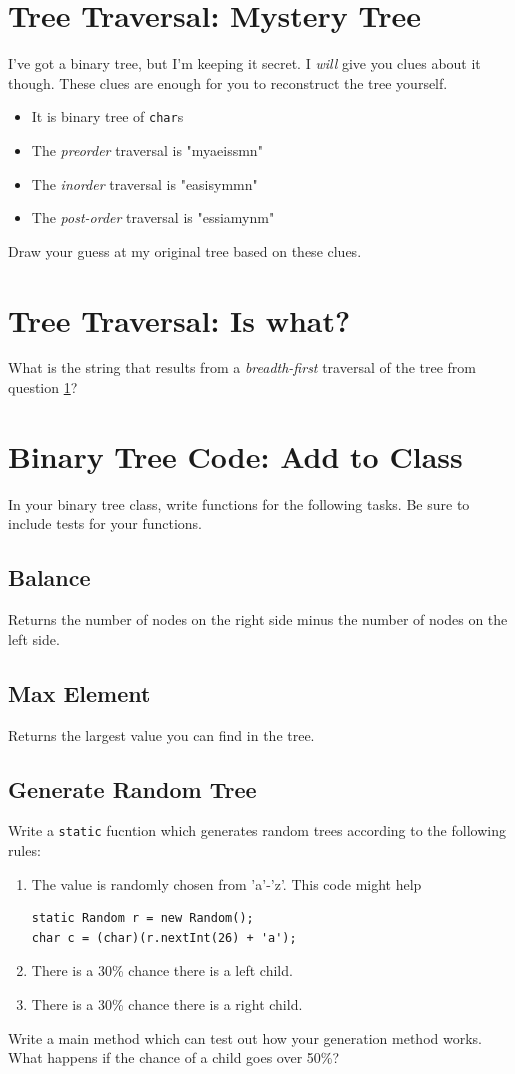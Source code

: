 \documentclass[twoside=false,DIV=14]{scrartcl}
\begin{document}
\section{Tree Traversal: Mystery Tree}
\label{sec:submission}

I've got a binary tree, but I'm keeping it secret.  I \emph{will} give you clues about it though.  These clues are enough for you to reconstruct the tree yourself.
\begin{itemize}
\item It is binary tree of \verb+char+s
\item The \emph{preorder} traversal is "myaeissmn"
\item The \emph{inorder} traversal is "easisymmn"
\item The \emph{post-order} traversal is "essiamynm"
\end{itemize}

Draw your guess at my original tree based on these clues.

\section{Tree Traversal: Is what?} 
What is the string that results from a \emph{breadth-first} traversal of the tree from question \ref{sec:submission}?

\section{Binary Tree Code: Add to Class}   
In your binary tree class, write functions for the following tasks.  Be sure to include tests for your functions.

\subsection{Balance}
 Returns the number of nodes on the right side minus the number of nodes on the left side.
\subsection{Max Element}
 Returns the largest value you can find in the tree.
\subsection{Generate Random Tree}
Write a \verb+static+ fucntion which generates random trees according to the following rules:
\begin{enumerate}
    \item The value is randomly chosen from 'a'-'z'.  This code might help
    \begin{lstlisting}
static Random r = new Random();
char c = (char)(r.nextInt(26) + 'a');
    \end{lstlisting}
    \item There is a 30\% chance there is a left child.
    \item There is a 30\% chance there is a right child.
\end{enumerate}
Write a main method which can test out how your generation method works.  What happens if the chance of a child goes over 50\%?
\end{document}
